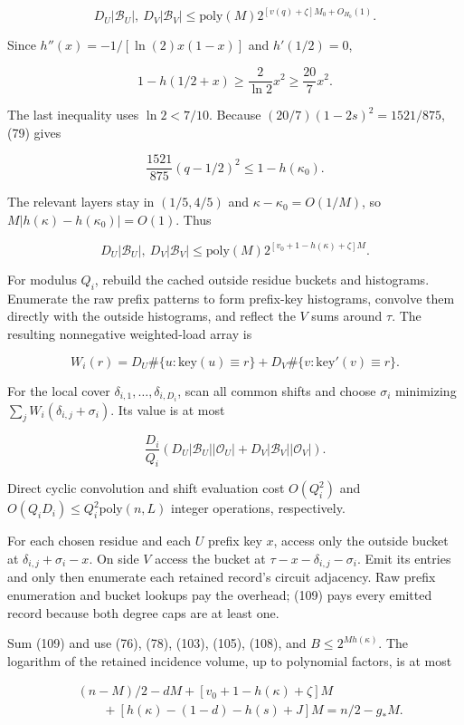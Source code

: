 \[
D_U|\mathcal B_U|,\ D_V|\mathcal B_V|
\le\mathrm{poly}(M)2^{[v(q)+\zeta]M_0+O_{H_0}(1)}.
\tag{107}
\]

Since \(h''(x)=-1/[\ln(2)x(1-x)]\) and \(h'(1/2)=0\),

\[
1-h(1/2+x)\ge\frac2{\ln2}x^2\ge\frac{20}{7}x^2.
\]

The last inequality uses \(\ln2<7/10\). Because \((20/7)(1-2s)^2=1521/875\), (79) gives

\[
\frac{1521}{875}(q-1/2)^2\le1-h(\kappa_0).
\]

The relevant layers stay in \((1/5,4/5)\) and \(\kappa-\kappa_0=O(1/M)\), so \(M|h(\kappa)-h(\kappa_0)|=O(1)\). Thus

\[
D_U|\mathcal B_U|,\ D_V|\mathcal B_V|
\le\mathrm{poly}(M)2^{[v_0+1-h(\kappa)+\zeta]M}.
\tag{108}
\]

For modulus \(Q_i\), rebuild the cached outside residue buckets and histograms. Enumerate the raw prefix patterns to form prefix-key histograms, convolve them directly with the outside histograms, and reflect the \(V\) sums around \(\tau\). The resulting nonnegative weighted-load array is

\[
W_i(r)=D_U\#\{u:\mathrm{key}(u)\equiv r\}
+D_V\#\{v:\mathrm{key}'(v)\equiv r\}.
\]

For the local cover \(\delta_{i,1},\ldots,\delta_{i,D_i}\), scan all common shifts and choose \(\sigma_i\) minimizing \(\sum_jW_i(\delta_{i,j}+\sigma_i)\). Its value is at most

\[
\frac{D_i}{Q_i}
\left(D_U|\mathcal B_U||\mathcal O_U|
+D_V|\mathcal B_V||\mathcal O_V|\right).
\tag{109}
\]

Direct cyclic convolution and shift evaluation cost \(O(Q_i^2)\) and \(O(Q_iD_i)\le Q_i^2\mathrm{poly}(n,L)\) integer operations, respectively.

For each chosen residue and each \(U\) prefix key \(x\), access only the outside bucket at \(\delta_{i,j}+\sigma_i-x\). On side \(V\) access the bucket at \(\tau-x-\delta_{i,j}-\sigma_i\). Emit its entries and only then enumerate each retained record's circuit adjacency. Raw prefix enumeration and bucket lookups pay the overhead; (109) pays every emitted record because both degree caps are at least one.

Sum (109) and use (76), (78), (103), (105), (108), and \(B\le2^{Mh(\kappa)}\). The logarithm of the retained incidence volume, up to polynomial factors, is at most

\[
\begin{aligned}
&(n-M)/2-dM+[v_0+1-h(\kappa)+\zeta]M\\
&\qquad+[h(\kappa)-(1-d)-h(s)+J]M
=n/2-g_*M.
\end{aligned}
\tag{110}
\]

